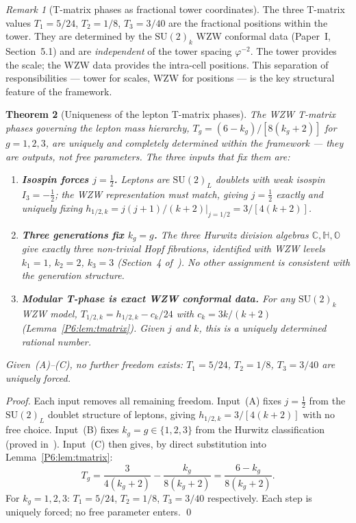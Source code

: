 \documentclass[11pt,a4paper]{article}
\newtheorem{theorem}{Theorem}[section]
\theoremstyle{definition}
\theoremstyle{remark}
\newtheorem{remark}[theorem]{Remark}
\newcommand{\vp}{\varphi}
\begin{document}
\begin{remark}[T-matrix phases as fractional tower coordinates]
The three T-matrix values $T_1 = 5/24$, $T_2 = 1/8$, $T_3 = 3/40$
are the fractional positions within the tower.  They are determined
by the $\mathrm{SU}(2)_k$ WZW conformal data (Paper~I, Section~5.1)
and are \emph{independent} of the tower spacing $\vp^{-2}$.  The tower
provides the scale; the WZW data provides the intra-cell positions.
This separation of responsibilities --- tower for scales, WZW for
positions --- is the key structural feature of the framework.
\end{remark}

\begin{theorem}[Uniqueness of the lepton T-matrix phases]
\label{P6:thm:tphase_unique}
The WZW T-matrix phases governing the lepton mass hierarchy,
$T_g = (6-k_g)/[8(k_g+2)]$ for $g=1,2,3$,
are \emph{uniquely and completely determined} within the framework ---
they are outputs, not free parameters.
The three inputs that fix them are:
\begin{enumerate}[noitemsep,label=\emph{(\Alph*)}]
\item \textbf{Isospin forces $j=\tfrac{1}{2}$.}
  Leptons are $\mathrm{SU}(2)_L$ doublets with weak isospin $I_3=-\tfrac{1}{2}$;
  the WZW representation must match, giving $j=\tfrac{1}{2}$ exactly and
  uniquely fixing $h_{1/2,k} = j(j+1)/(k+2)|_{j=1/2} = 3/[4(k+2)]$.
\item \textbf{Three generations fix $k_g = g$.}
  The three Hurwitz division algebras $\mathbb{C},\mathbb{H},\mathbb{O}$
  give exactly three non-trivial Hopf fibrations, identified with WZW levels
  $k_1=1$, $k_2=2$, $k_3=3$ (Section~4 of~\cite{Paper1}).
  No other assignment is consistent with the generation structure.
\item \textbf{Modular T-phase is exact WZW conformal data.}
  For any $\mathrm{SU}(2)_k$ WZW model, $T_{1/2,k} = h_{1/2,k} - c_k/24$
  with $c_k = 3k/(k+2)$ (Lemma~\ref{P6:lem:tmatrix}).
  Given $j$ and $k$, this is a uniquely determined rational number.
\end{enumerate}
Given~\emph{(A)}--\emph{(C)}, no further freedom exists:
$T_1 = 5/24$, $T_2 = 1/8$, $T_3 = 3/40$ are uniquely forced.
\end{theorem}

\begin{proof}
Each input removes all remaining freedom.
Input~(A) fixes $j=\tfrac{1}{2}$ from the $\mathrm{SU}(2)_L$ doublet
structure of leptons, giving $h_{1/2,k} = 3/[4(k+2)]$ with no free choice.
Input~(B) fixes $k_g = g \in \{1,2,3\}$ from the Hurwitz classification
(proved in~\cite{Paper1}).
Input~(C) then gives, by direct substitution into Lemma~\ref{P6:lem:tmatrix}:
\[
  T_g = \frac{3}{4(k_g+2)} - \frac{k_g}{8(k_g+2)} = \frac{6-k_g}{8(k_g+2)}.
\]
For $k_g=1,2,3$: $T_1=5/24$, $T_2=1/8$, $T_3=3/40$ respectively.
Each step is uniquely forced; no free parameter enters.
\qed
\end{proof}
\end{document}
